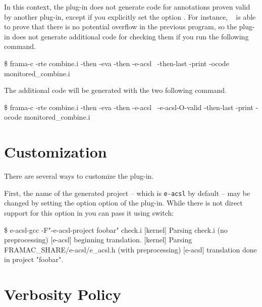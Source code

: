 In this context, the \eacsl plug-in does not generate code for annotations
proven valid by another plug-in, except if you explicitly set the option
. For instance, \Eva~\cite{eva} is able to
prove that there is no potential overflow in the previous program, so the \eacsl
plug-in does not generate additional code for checking them if you run the
following command.
\begin{frama-c-commands}
\$ frama-c -rte combine.i -then -eva -then -e-acsl \
  -then-last -print -ocode monitored_combine.i
\end{frama-c-commands}
The additional code will be generated with the two following command.
\begin{frama-c-commands}
\$ frama-c -rte combine.i -then -eva -then -e-acsl \
  -e-acsl-O-valid -then-last -print -ocode monitored_combine.i
\end{frama-c-commands}

\section{Customization} %
\label{sec:custom}

There are several ways to customize the \eacsl plug-in.

First, the name of the generated project -- which is \texttt{e-acsl} by default
-- may be changed by setting the option  option of the
\eacsl plug-in. While there is not direct support for this option in \eacslgcc
you can pass it using \shortopt{F} switch:


\begin{logs}
\$ e-acsl-gcc -F"-e-acsl-project foobar" check.i
[kernel] Parsing check.i (no preprocessing)
[e-acsl] beginning translation.
[kernel] Parsing FRAMAC_SHARE/e-acsl/e_acsl.h (with preprocessing)
[e-acsl] translation done in project "foobar".
\end{logs}

\section{Verbosity Policy} %
\label{sec:verbose}

